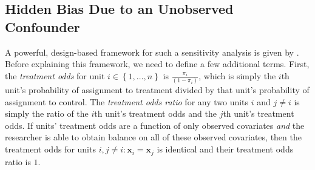 \documentclass[11pt,leqno]{article}\usepackage[]{graphicx}\usepackage[]{color}
\theoremstyle{newstyle}
\begin{document}
\subsection{Hidden Bias Due to an Unobserved Confounder}

A powerful, design-based framework for such a sensitivity analysis is given by \citet{rosenbaum2002observational}. Before explaining this framework, we need to define a few additional terms. First, the \textit{treatment odds} for unit $i \in \left\{1, \ldots , n\right\}$ is $\frac{\pi_i}{\left(1 - \pi_i\right)}$, which is simply the $i$th unit's probability of assignment to treatment divided by that unit's probability of assignment to control. The \textit{treatment odds ratio} for any two units $i$ and $j \neq i$ is simply the ratio of the $i$th unit's treatment odds and the $j$th unit's treatment odds. If units' treatment odds are a function of only observed covariates \textit{and} the researcher is able to obtain balance on all of these observed covariates, then the treatment odds for units $i, j \neq i: \mathbf{x}_i = \mathbf{x}_j$ is identical and their treatment odds ratio is $1$.
\end{document}
